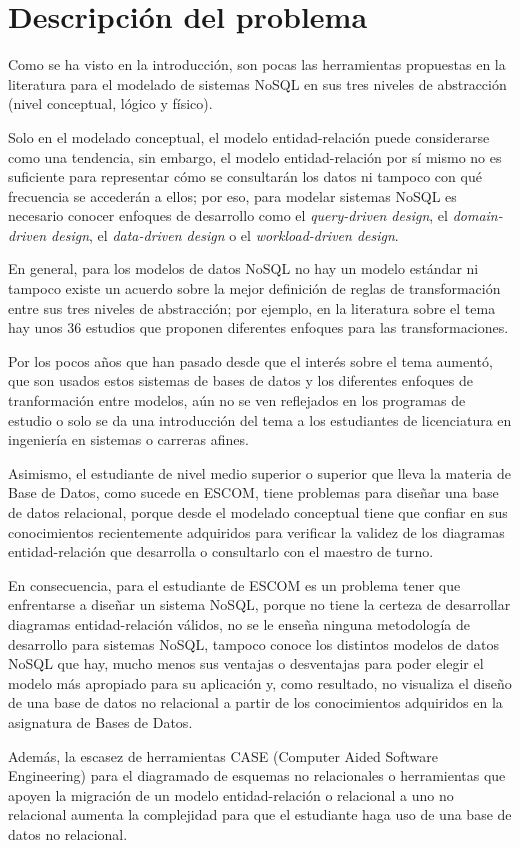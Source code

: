 \section{Descripción del problema}
Como se ha visto en la introducción, son pocas las herramientas propuestas en la literatura para el modelado de sistemas NoSQL en sus tres niveles de abstracción (nivel conceptual, lógico y físico).


Solo en el modelado conceptual, el modelo entidad-relación puede considerarse como una tendencia, sin embargo, el modelo entidad-relación por sí mismo no es suficiente para representar cómo se consultarán los datos ni tampoco con qué frecuencia se accederán a ellos; por eso, para modelar sistemas NoSQL es necesario conocer enfoques de desarrollo como el \textit{query-driven design}, el \textit{domain-driven design}, el \textit{data-driven design} o el \textit{workload-driven design}.


En general, para los modelos de datos NoSQL no hay un modelo estándar ni tampoco existe un acuerdo sobre la mejor definición de reglas de transformación entre sus tres niveles de abstracción; por ejemplo, en la literatura sobre el tema hay unos 36 estudios\cite{martinez-mosquera_modeling_2020} que proponen diferentes enfoques para las transformaciones.


Por los pocos años que han pasado desde que el interés sobre el tema aumentó, que son usados estos sistemas de bases de datos y los diferentes enfoques de tranformación entre modelos, aún no se ven reflejados en los programas de estudio o solo se da una introducción del tema a los estudiantes de licenciatura en ingeniería en sistemas o carreras afines. 


Asimismo, el estudiante de nivel medio superior o superior que lleva la materia de Base de Datos, como sucede en ESCOM, tiene problemas para diseñar una base de datos relacional, porque desde el modelado conceptual tiene que confiar en sus conocimientos recientemente adquiridos para verificar la validez de los diagramas entidad-relación que desarrolla o consultarlo con el maestro de turno.


En consecuencia, para el estudiante de ESCOM es un problema tener que enfrentarse a diseñar un sistema NoSQL, porque no tiene la certeza de desarrollar diagramas entidad-relación válidos, no se le enseña ninguna metodología de desarrollo para sistemas NoSQL, tampoco conoce los distintos modelos de datos NoSQL que hay, mucho menos sus ventajas o desventajas para poder elegir el modelo más apropiado para su aplicación y, como resultado, no visualiza el diseño de una base de datos no relacional a partir de los conocimientos adquiridos en la asignatura de Bases de Datos.


Además, la escasez de herramientas CASE (Computer Aided Software Engineering) para el diagramado de esquemas no relacionales o herramientas que apoyen la migración de un modelo entidad-relación o relacional a uno no relacional aumenta la complejidad para que el estudiante haga uso de una base de datos no relacional.
